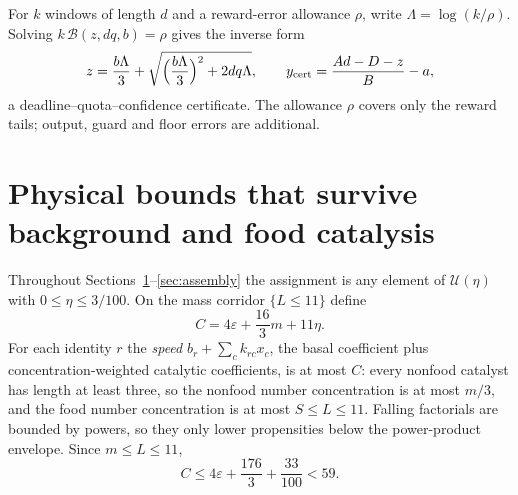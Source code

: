 \documentclass[11pt,letterpaper]{article}
\theoremstyle{plain}
\theoremstyle{definition}
\theoremstyle{remark}
\numberwithin{equation}{section}
\newcommand{\cB}{\mathcal B}
\newcommand{\cU}{\mathcal U}
\newcommand{\eps}{\varepsilon}
\begin{document}
For $k$ windows of length $d$ and a reward-error allowance $\rho$, write $\Lambda=\log(k/\rho)$. Solving $k\,\cB(z,dq,b)=\rho$ gives the inverse form
\begin{equation}\label{eq:inverse}
 z=\frac{b\Lambda}3+\sqrt{\Bigl(\frac{b\Lambda}3\Bigr)^2+2dq\Lambda},\qquad y_{\rm cert}=\frac{Ad-D-z}{B}-a ,
\end{equation}
a deadline--quota--confidence certificate. The allowance $\rho$ covers only the reward tails; output, guard and floor errors are additional.

\section{Physical bounds that survive background and food catalysis}\label{sec:physical}

Throughout Sections~\ref{sec:physical}--\ref{sec:assembly} the assignment is any element of $\cU(\eta)$ with $0\le\eta\le3/100$. On the mass corridor $\{L\le11\}$ define
\begin{equation}\label{eq:C}
 C=4\eps+\frac{16}3m+11\eta .
\end{equation}
For each identity $r$ the \emph{speed} $b_r+\sum_ck_{rc}x_c$, the basal coefficient plus concentration-weighted catalytic coefficients, is at most $C$: every nonfood catalyst has length at least three, so the nonfood number concentration is at most $m/3$, and the food number concentration is at most $S\le L\le11$. Falling factorials are bounded by powers, so they only lower propensities below the power-product envelope. Since $m\le L\le11$,
\begin{equation}\label{eq:C59}
 C\le4\eps+\frac{176}3+\frac{33}{100}<59 .
\end{equation}
\end{document}
